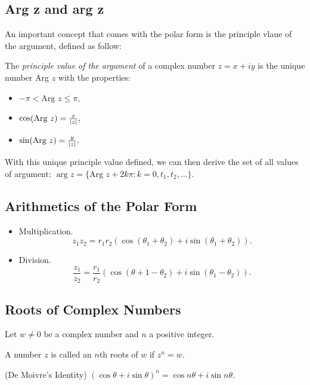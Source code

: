 \documentclass[11pt,reqno,oneside,a4paper]{article}
\begin{document}
\subsection{Arg z and arg z} An important concept that comes with the polar form is the principle vlaue of the argument, defined as follow:
\begin{defn}
	The \textit{principle value of the argument} of a complex number $z = x+iy$ is the unique number Arg $z$ with the properties: 
	
	\begin{itemize}
		\item $-\pi < \text{Arg }z \leq \pi,$
		\item $\cos(\text{Arg }z) = \frac{x}{\left\lvert z\right\rvert},$
		\item $\sin(\text{Arg }z) = \frac{y}{\left\lvert z\right\rvert}.$
	\end{itemize}
	With this unique principle value defined, we can then derive the set of all values of argument: $\arg z = \{\text{Arg }z + 2k\pi: k = 0, t_1, t_2,\dots\}.$
	
\end{defn}

\subsection{Arithmetics of the Polar Form}
\begin{itemize}
	\item Multiplication.
	$$z_1 z_2 = r_1 r_2 (\cos(\theta_1 +\theta_2) + i\sin(\theta_1 +\theta_2)).$$
	
	\item Division.
	$$\frac{z_1}{z_2} = \frac{r_1}{r_2} (\cos(\theta+1 - \theta_2) + i\sin(\theta_1-\theta_2)).$$
\end{itemize}

\subsection{Roots of Complex Numbers}

\begin{defn}
	Let $w\neq 0$ be a complex number and $n$ a positive integer. 
	
	A number $z$ is called an $n$th roots of $w$ if $z^n = w$. 
\end{defn}

\begin{prop}
	(De Moivre's Identity) $(\cos \theta +i\sin \theta)^n = \cos n \theta + i\sin n \theta$.
\end{prop}
\end{document}

